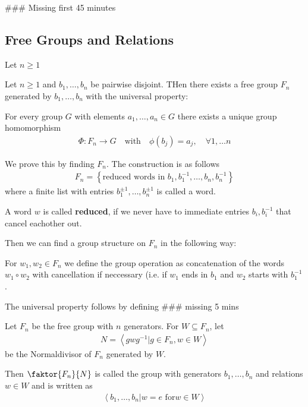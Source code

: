 \begin{center}
	\#\#\# Missing first 45 minutes
\end{center}



\subsection{Free Groups and Relations}

\begin{definition}[]
	Let $n \geq 1$
\end{definition}


\begin{theorem}[]
	Let $n \geq 1$ and $b_1, \ldots, b_n$ be pairwise disjoint. THen there exists a free group $F_n$ generated by $b_1, \ldots, b_n$ with the universal property:

For every group $G$ with elements $a_{1}, \ldots, a_{n} \in G$ there exists a unique group homomorphism 
\begin{align*}
	\Phi: F_n \to G \quad \text{with} \quad \phi(b_j) = a_j, \quad \forall 1, \ldots n
\end{align*}
\end{theorem}

We prove this by finding $F_n$. The construction is as follows
\begin{align*}
	F_n = \left\{\text{reduced words in } b_1,b_1^{-1}, \ldots, b_n,b_n^{-1}\right\}
\end{align*}
where a finite list with entries $b_1^{\pm 1}, \ldots, b_n^{\pm 1}$ is called a word.

A word $w$ is called \textbf{reduced}, if we never have to immediate entries $b_i,b_i^{-1}$ that cancel eachother out. 

Then we can find a group structure on $F_n$ in the following way:

For $w_1,w_2 \in F_n$ we define the group operation as concatenation of the words $w_1 \circ w_2$ with cancellation if neccessary (i.e. if $w_1$ ends in $b_1$ and $w_2$ starts with $b_1^{-1}$.

The universal property follows by defining \#\#\# missing 5 mins


\begin{definition}[Relations]
	Let $F_n$ be the free group with $n$ generators. For $W \subseteq F_n$, let
	\begin{align*}
	N = \left<gwg^{-1} \big\vert g \in F_n, w \in W\right>
	\end{align*}
	be the Normaldivisor of $F_n$ generated by $W$.

	Then $\faktor{F_n}{N}$ is called the group with generators $b_1, \ldots, b_n$ and relations $w \in W$ and is written as
	\begin{align*}
		\left<b_1, \ldots, b_n \big\vert w = e \text{ for} w \in W\right>
	\end{align*}
\end{definition}


